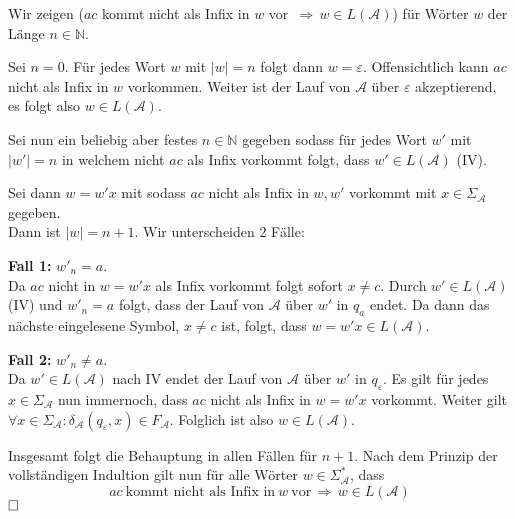 \documentclass[a4paper,graphics,11pt]{article}
\begin{document}
Wir zeigen ($ac$ kommt nicht als Infix in $w$ vor $\,\Longrightarrow\, w \in L(\mathcal{A})$) für Wörter $w$ der
Länge $n \in \mathbb{N}$.

Sei $n = 0$. Für jedes Wort $w$ mit $|w| = n$ folgt dann $w = \varepsilon$. Offensichtlich kann $ac$ nicht als
Infix in $w$ vorkommen. Weiter ist der Lauf von $\mathcal{A}$ über $\varepsilon$ akzeptierend, es folgt also
$w \in L(\mathcal{A})$.

Sei nun ein beliebig aber festes $n \in \mathbb{N}$ gegeben sodass für jedes Wort $w'$ mit $|w'| = n$ in welchem
nicht $ac$ als Infix vorkommt folgt, dass $w' \in L(\mathcal{A})$ (IV).

Sei dann $w = w'x$ mit sodass $ac$ nicht als Infix in $w, w'$ vorkommt mit $x \in \Sigma_\mathcal{A}$ gegeben.\\
Dann ist $|w| = n+1$. Wir unterscheiden 2 Fälle:

\textbf{Fall 1:} $w'_n = a$.\\
Da $ac$ nicht in $w = w'x$ als Infix vorkommt folgt sofort $x \neq c$. Durch $w' \in L(\mathcal{A})$ (IV) und
$w'_n = a$ folgt, dass der Lauf von $\mathcal{A}$ über $w'$ in $q_a$ endet. Da dann das nächste eingelesene Symbol,
$x \neq c$ ist, folgt, dass $w = w'x \in L(\mathcal{A})$.

\textbf{Fall 2:} $w'_n \neq a$.\\
Da $w' \in L(\mathcal{A})$ nach IV endet der Lauf von $\mathcal{A}$ über $w'$ in $q_\varepsilon$. Es gilt
für jedes $x \in \Sigma_\mathcal{A}$ nun immernoch, dass $ac$ nicht als Infix in $w = w'x$ vorkommt. Weiter gilt
$\forall x \in \Sigma_\mathcal{A} : \delta_\mathcal{A}(q_\varepsilon, x) \in F_\mathcal{A}$.
Folglich ist also $w \in L(\mathcal{A})$.

Insgesamt folgt die Behauptung in allen Fällen für $n+1$. Nach dem Prinzip der vollständigen Indultion gilt
nun für alle Wörter $w \in \Sigma_\mathcal{A}^*$, dass
$$
    ac\ \text{kommt nicht als Infix in}\ w\ \text{vor} \,\Longrightarrow\, w \in L(\mathcal{A})
$$
$\hfill\square$
\end{document}
